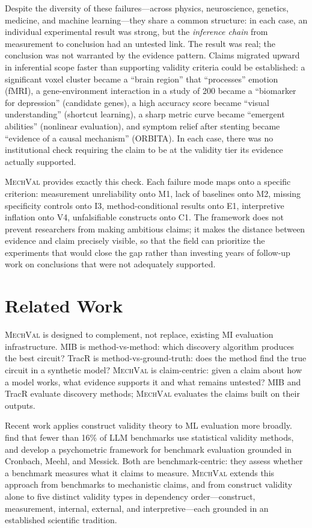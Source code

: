 \documentclass[10pt]{article}
\newcommand{\mechval}{\textsc{MechVal}}
\begin{document}
Despite the diversity of these failures---across physics, neuroscience, genetics, medicine, and machine learning---they share a common structure: in each case, an individual experimental result was strong, but the \emph{inference chain} from measurement to conclusion had an untested link. The result was real; the conclusion was not warranted by the evidence pattern. Claims migrated upward in inferential scope faster than supporting validity criteria could be established: a significant voxel cluster became a ``brain region'' that ``processes'' emotion (fMRI), a gene-environment interaction in a study of 200 became a ``biomarker for depression'' (candidate genes), a high accuracy score became ``visual understanding'' (shortcut learning), a sharp metric curve became ``emergent abilities'' (nonlinear evaluation), and symptom relief after stenting became ``evidence of a causal mechanism'' (ORBITA). In each case, there was no institutional check requiring the claim to be at the validity tier its evidence actually supported.

\mechval{} provides exactly this check. Each failure mode maps onto a specific criterion: measurement unreliability onto M1, lack of baselines onto M2, missing specificity controls onto I3, method-conditional results onto E1, interpretive inflation onto V4, unfalsifiable constructs onto C1. The framework does not prevent researchers from making ambitious claims; it makes the distance between evidence and claim precisely visible, so that the field can prioritize the experiments that would close the gap rather than investing years of follow-up work on conclusions that were not adequately supported.


\section{Related Work}
\label{sec:related}

\mechval{} is designed to complement, not replace, existing MI evaluation infrastructure. MIB \citep{mueller2025mib} is method-vs-method: which discovery algorithm produces the best circuit? TracR \citep{lindner2024interp} is method-vs-ground-truth: does the method find the true circuit in a synthetic model? \mechval{} is claim-centric: given a claim about how a model works, what evidence supports it and what remains untested? MIB and TracR evaluate discovery methods; \mechval{} evaluates the claims built on their outputs.

Recent work applies construct validity theory to ML evaluation more broadly. \citet{bean2025measuring} find that fewer than 16\% of LLM benchmarks use statistical validity methods, and \citet{freiesleben2025benchmarking} develop a psychometric framework for benchmark evaluation grounded in Cronbach, Meehl, and Messick. Both are benchmark-centric: they assess whether a benchmark measures what it claims to measure. \mechval{} extends this approach from benchmarks to mechanistic claims, and from construct validity alone to five distinct validity types in dependency order---construct, measurement, internal, external, and interpretive---each grounded in an established scientific tradition.
\end{document}
